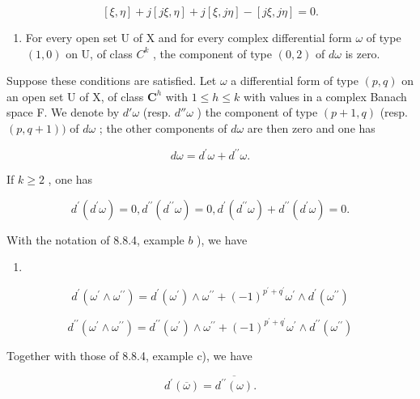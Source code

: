 \[
[ \xi , \eta ] + j [ j \xi , \eta ] + j [ \xi , j \eta ] - [ j \xi , j \eta ] = 0.
\]

\begin{enumerate}
\def\labelenumi{(\roman{enumi})}
\setcounter{enumi}{2}
\tightlist
\item
  For every open set U of X and for every complex differential form \(\omega\) of type \((1,0)\) on U, of class \(C^{k}\) , the component of type \((0,2)\) of \(d\omega\) is zero.
\end{enumerate}

Suppose these conditions are satisfied. Let \(\omega\) a differential form of type \((p,q)\) on an open set U of X, of class \(\mathbf{C}^h\) with \(1\leqslant h\leqslant k\) with values in a complex Banach space F. We denote by \(d'\omega\) (resp. \(d''\omega\) ) the component of type \((p+1,q)\) (resp. \((p,q+1))\) of \(d\omega\) ; the other components of \(d\omega\) are then zero and one has

\[
d \omega = d ^ {\prime} \omega + d ^ {\prime \prime} \omega .\tag{2}
\]

If \(k\geqslant 2\) , one has

\[
d ^ {\prime} (d ^ {\prime} \omega) = 0, d ^ {\prime \prime} (d ^ {\prime \prime} \omega) = 0, d ^ {\prime} (d ^ {\prime \prime} \omega) + d ^ {\prime \prime} (d ^ {\prime} \omega) = 0.\tag{3}
\]

With the notation of 8.8.4, example \(b\) ), we have

\begin{enumerate}
\def\labelenumi{(\arabic{enumi})}
\setcounter{enumi}{3}
\tightlist
\item
\end{enumerate}

\[
d ^ {\prime} \left(\omega^ {\prime} \wedge \omega^ {\prime \prime}\right) = d ^ {\prime} \left(\omega^ {\prime}\right) \wedge \omega^ {\prime \prime} + (- 1) ^ {p ^ {\prime} + q ^ {\prime}} \omega^ {\prime} \wedge d ^ {\prime} \left(\omega^ {\prime \prime}\right)\tag{4}
\]

\[
d ^ {\prime \prime} (\omega^ {\prime} \wedge \omega^ {\prime \prime}) = d ^ {\prime \prime} (\omega^ {\prime}) \wedge \omega^ {\prime \prime} + (- 1) ^ {p ^ {\prime} + q ^ {\prime}} \omega^ {\prime} \wedge d ^ {\prime \prime} (\omega^ {\prime \prime})\tag{5}
\]

Together with those of 8.8.4, example c), we have

\[
d ^ {\prime} (\overline {{\omega}}) = \overline {{d ^ {\prime \prime} (\omega)}}.\tag{6}
\]

